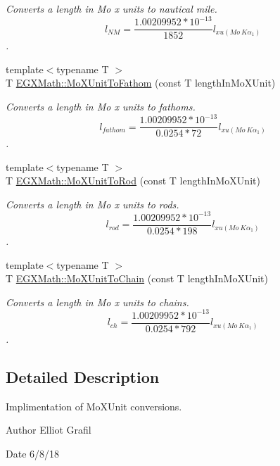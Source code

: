 \begin{DoxyCompactItemize}
\begin{DoxyCompactList}\small\item\em Converts a length in Mo x units to nautical mile. \[ l_{NM}= \frac{1.00209952*10^{-13}}{1852} l_{xu(Mo\ K\alpha_1)} \]. \end{DoxyCompactList}\item 
{\footnotesize template$<$typename T $>$ }\\T \mbox{\hyperlink{group___e_g_x_math-_conversions-_length_conversions-_non-_s_i-_mo_x_unit-_nautical_gaac0c77d19dcc5ce04affa038de610b4a}{E\+G\+X\+Math\+::\+Mo\+X\+Unit\+To\+Fathom}} (const T length\+In\+Mo\+X\+Unit)
\begin{DoxyCompactList}\small\item\em Converts a length in Mo x units to fathoms. \[ l_{fathom}= \frac{1.00209952*10^{-13}}{0.0254 * 72} l_{xu(Mo\ K\alpha_1)} \]. \end{DoxyCompactList}\item 
{\footnotesize template$<$typename T $>$ }\\T \mbox{\hyperlink{group___e_g_x_math-_conversions-_length_conversions-_non-_s_i-_mo_x_unit-_surveyors_ga087c126bbeacfc3f9786ce20c1d9c2e1}{E\+G\+X\+Math\+::\+Mo\+X\+Unit\+To\+Rod}} (const T length\+In\+Mo\+X\+Unit)
\begin{DoxyCompactList}\small\item\em Converts a length in Mo x units to rods. \[ l_{rod}= \frac{1.00209952*10^{-13}}{0.0254 * 198} l_{xu(Mo\ K\alpha_1)} \]. \end{DoxyCompactList}\item 
{\footnotesize template$<$typename T $>$ }\\T \mbox{\hyperlink{group___e_g_x_math-_conversions-_length_conversions-_non-_s_i-_mo_x_unit-_surveyors_ga07a643eb483183e8d391856d32f5a519}{E\+G\+X\+Math\+::\+Mo\+X\+Unit\+To\+Chain}} (const T length\+In\+Mo\+X\+Unit)
\begin{DoxyCompactList}\small\item\em Converts a length in Mo x units to chains. \[ l_{ch}= \frac{1.00209952*10^{-13}}{0.0254 * 792} l_{xu(Mo\ K\alpha_1)} \]. \end{DoxyCompactList}\end{DoxyCompactItemize}


\subsection{Detailed Description}
Implimentation of Mo\+X\+Unit conversions. 

\begin{DoxyAuthor}{Author}
Elliot Grafil 
\end{DoxyAuthor}
\begin{DoxyDate}{Date}
6/8/18 
\end{DoxyDate}
